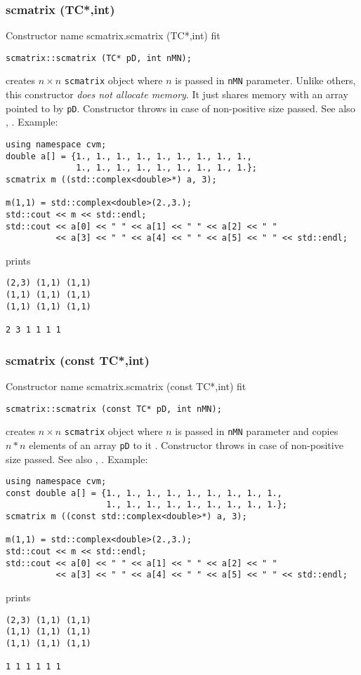 \subsubsection{scmatrix (TC*,int)}
Constructor%
\pdfdest name {scmatrix.scmatrix (TC*,int)} fit
\begin{verbatim}
scmatrix::scmatrix (TC* pD, int nMN);
\end{verbatim}
creates  $n\times n$ \verb"scmatrix" object where $n$ is passed in
\verb"nMN" parameter.
Unlike others, this constructor \textit{does not allocate  memory}.
It just shares  memory with an array pointed to by \verb"pD".
Constructor throws  
in case of non-positive size passed.
See also ,
.
Example:
\begin{Verbatim}
using namespace cvm;
double a[] = {1., 1., 1., 1., 1., 1., 1., 1., 1.,
              1., 1., 1., 1., 1., 1., 1., 1., 1.};
scmatrix m ((std::complex<double>*) a, 3);

m(1,1) = std::complex<double>(2.,3.);
std::cout << m << std::endl;
std::cout << a[0] << " " << a[1] << " " << a[2] << " "
          << a[3] << " " << a[4] << " " << a[5] << " " << std::endl;
\end{Verbatim}
prints
\begin{Verbatim}
(2,3) (1,1) (1,1)
(1,1) (1,1) (1,1)
(1,1) (1,1) (1,1)

2 3 1 1 1 1
\end{Verbatim}
\newpage


\subsubsection{scmatrix (const TC*,int)}
Constructor%
\pdfdest name {scmatrix.scmatrix (const TC*,int)} fit
\begin{verbatim}
scmatrix::scmatrix (const TC* pD, int nMN);
\end{verbatim}
creates  $n\times n$ \verb"scmatrix" object where $n$ is passed in
\verb"nMN" parameter
and copies $n*n$ elements of an array  \verb"pD" to it .
Constructor throws  
in case of non-positive size passed.
See also ,
.
Example:
\begin{Verbatim}
using namespace cvm;
const double a[] = {1., 1., 1., 1., 1., 1., 1., 1., 1.,
                    1., 1., 1., 1., 1., 1., 1., 1., 1.};
scmatrix m ((const std::complex<double>*) a, 3);

m(1,1) = std::complex<double>(2.,3.);
std::cout << m << std::endl;
std::cout << a[0] << " " << a[1] << " " << a[2] << " "
          << a[3] << " " << a[4] << " " << a[5] << " " << std::endl;
\end{Verbatim}
prints
\begin{Verbatim}
(2,3) (1,1) (1,1)
(1,1) (1,1) (1,1)
(1,1) (1,1) (1,1)

1 1 1 1 1 1
\end{Verbatim}
\newpage




